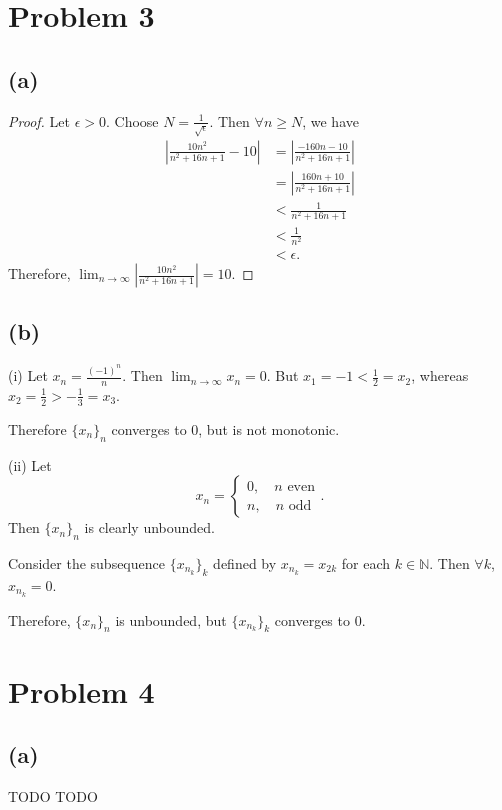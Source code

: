 \documentclass{article}
\newcommand{\N}{\mathbb{N}} %
\begin{document}
\section*{Problem 3}
\subsection*{(a)}
\begin{proof}
	Let $\epsilon > 0$. Choose $N = \frac{1}{\sqrt{\epsilon}}$. Then $\forall n \geq N$, we have
	\begin{align}
		\left|\frac{10n^2}{n^2 + 16n + 1} - 10\right| &= \left|\frac{-160n - 10}{n^2 + 16n + 1}\right| \\
		&= \left|\frac{160n + 10}{n^2 + 16n + 1}\right| \\
		&< \frac{1}{n^2 + 16n + 1} \\
		&< \frac{1}{n^2} \\
		&< \epsilon.
	\end{align}
	Therefore, $\lim_{n \to \infty} \left|\frac{10n^2}{n^2 + 16n + 1}\right| = 10$.
\end{proof}

\subsection*{(b)}
(i) Let $x_n = \frac{(-1)^n}{n}$. Then $\lim_{n \to \infty} x_n = 0$. But $x_1 = -1 < \frac{1}{2} = x_2$, whereas $x_2 = \frac{1}{2} > -\frac{1}{3} = x_3$. 

Therefore $\{x_n\}_n$ converges to $0$, but is not monotonic.

(ii) Let 
\begin{equation}
	x_n = \begin{cases}
		0, \quad n \textrm{ even} \\
		n, \quad n \textrm{ odd}
	\end{cases}.
\end{equation}
Then $\{x_n\}_n$ is clearly unbounded.

Consider the subsequence $\{x_{n_k}\}_k$ defined by $x_{n_k} = x_{2k}$ for each $k \in \N$. Then $\forall k$, $x_{n_k} = 0$.

Therefore, $\{x_n\}_n$ is unbounded, but $\{x_{n_k}\}_k$ converges to $0$. 
\section*{Problem 4}
\subsection*{(a)}
TODO TODO
\end{document}
